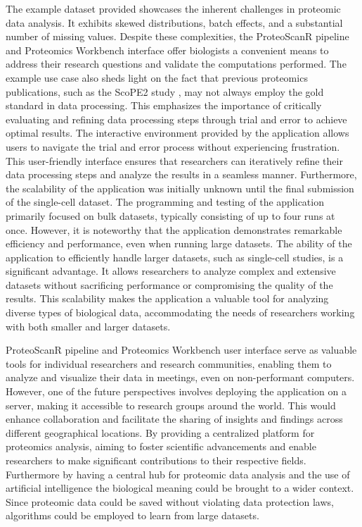 \documentclass[
  11pt,
]{article}
\begin{document}
The example dataset provided showcases the inherent challenges in proteomic data analysis. It exhibits skewed distributions, batch effects, and a substantial number of missing values. Despite these complexities, the ProteoScanR pipeline and Proteomics Workbench interface offer biologists a convenient means to address their research questions and validate the computations performed. The example use case also sheds light on the fact that previous proteomics publications, such as the ScoPE2 study \citep{Specht2021}, may not always employ the gold standard in data processing. This emphasizes the importance of critically evaluating and refining data processing steps through trial and error to achieve optimal results. The interactive environment provided by the application allows users to navigate the trial and error process without experiencing frustration. This user-friendly interface ensures that researchers can iteratively refine their data processing steps and analyze the results in a seamless manner. Furthermore, the scalability of the application was initially unknown until the final submission of the single-cell dataset. The programming and testing of the application primarily focused on bulk datasets, typically consisting of up to four runs at once. However, it is noteworthy that the application demonstrates remarkable efficiency and performance, even when running large datasets. The ability of the application to efficiently handle larger datasets, such as single-cell studies, is a significant advantage. It allows researchers to analyze complex and extensive datasets without sacrificing performance or compromising the quality of the results. This scalability makes the application a valuable tool for analyzing diverse types of biological data, accommodating the needs of researchers working with both smaller and larger datasets.

ProteoScanR pipeline and Proteomics Workbench user interface serve as valuable tools for individual researchers and research communities, enabling them to analyze and visualize their data in meetings, even on non-performant computers. However, one of the future perspectives involves deploying the application on a server, making it accessible to research groups around the world. This would enhance collaboration and facilitate the sharing of insights and findings across different geographical locations. By providing a centralized platform for proteomics analysis, aiming to foster scientific advancements and enable researchers to make significant contributions to their respective fields. Furthermore by having a central hub for proteomic data analysis and the use of artificial intelligence the biological meaning could be brought to a wider context. Since proteomic data could be saved without violating data protection laws, algorithms could be employed to learn from large datasets.
\end{document}

